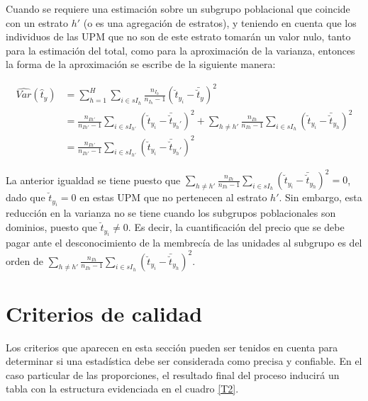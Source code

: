 \documentclass[12pt,spanish,]{book}
\begin{document}
Cuando se requiere una estimación sobre un subgrupo poblacional que coincide con un estrato \(h'\) (o es una agregación de estratos), y teniendo en cuenta que los individuos de las UPM que no son de este estrato tomarán un valor nulo, tanto para la estimación del total, como para la aproximación de la varianza, entonces la forma de la aproximación se escribe de la siguiente manera:

\begin{align*}
\widehat{Var}(\hat{t}_y) &=
\sum_{h=1}^H \sum_{i \in sI_h}\frac{n_{I_h}}{n_{I_h}-1}\left( \breve{t}_{y_i} - \bar{\breve{t}}_{y} \right)^2\\
&=
\frac{n_{Ih'}}{n_{Ih'} -1}\sum_{i \in   sI_{h'}}\left( \breve{t}_{y_i} - \bar{\breve{t}}_{y_h'} \right)^2 + \sum_{h \neq h'} \frac{n_{Ih}}{n_{Ih} -1}\sum_{i \in   sI_h}\left( \breve{t}_{y_i} - \bar{\breve{t}}_{y_h} \right)^2\\
&=\frac{n_{Ih'}}{n_{Ih'} -1}\sum_{i \in   sI_{h'}}\left( \breve{t}_{y_i} - \bar{\breve{t}}_{y_h'} \right)^2
\end{align*}

La anterior igualdad se tiene puesto que \(\sum_{h \neq h'} \frac{n_{Ih}}{n_{Ih} -1}\sum_{i \in sI_h}\left( \breve{t}_{y_i} - \bar{\breve{t}}_{y_h} \right)^2=0\), dado que \(\breve{t}_{y_i} =0\) en estas UPM que no pertenecen al estrato \(h'\). Sin embargo, esta reducción en la varianza no se tiene cuando los subgrupos poblacionales son dominios, puesto que \(\breve{t}_{y_i} \neq 0\). Es decir, la cuantificación del precio que se debe pagar ante el desconocimiento de la membrecía de las unidades al subgrupo es del orden de \(\sum_{h \neq h'} \frac{n_{Ih}}{n_{Ih} -1}\sum_{i \in sI_h}\left( \breve{t}_{y_i} - \bar{\breve{t}}_{y_h} \right)^2\).

\hypertarget{criterios-de-calidad}{%
\section{Criterios de calidad}\label{criterios-de-calidad}}

Los criterios que aparecen en esta sección pueden ser tenidos en cuenta para determinar si una estadística debe ser considerada como precisa y confiable. En el caso particular de las proporciones, el resultado final del proceso inducirá un tabla con la estructura evidenciada en el cuadro \ref{T2}.

\footnotesize
\end{document}
